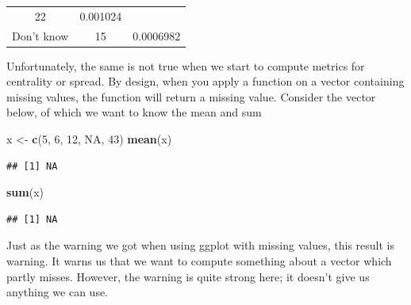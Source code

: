 \documentclass[]{tufte-book}
\newenvironment{Shaded}{}{}
\newcommand{\KeywordTok}[1]{\textcolor[rgb]{0.00,0.44,0.13}{\textbf{#1}}}
\newcommand{\DecValTok}[1]{\textcolor[rgb]{0.25,0.63,0.44}{#1}}
\newcommand{\StringTok}[1]{\textcolor[rgb]{0.25,0.44,0.63}{#1}}
\newcommand{\OtherTok}[1]{\textcolor[rgb]{0.00,0.44,0.13}{#1}}
\newcommand{\NormalTok}[1]{#1}
\begin{document}
\begin{longtable}[]{@{}ccc@{}}
\begin{minipage}[t]{0.15\columnwidth}
22\strut
\end{minipage} & \begin{minipage}[t]{0.25\columnwidth}\centering\strut
0.001024\strut
\end{minipage}\tabularnewline
\begin{minipage}[t]{0.33\columnwidth}\centering\strut
Don't know\strut
\end{minipage} & \begin{minipage}[t]{0.15\columnwidth}\centering\strut
15\strut
\end{minipage} & \begin{minipage}[t]{0.25\columnwidth}\centering\strut
0.0006982\strut
\end{minipage}\tabularnewline
\bottomrule
\end{longtable}

Unfortunately, the same is not true when we start to compute metrics for
centrality or spread. By design, when you apply a function on a vector
containing missing values, the function will return a missing value.
Consider the vector below, of which we want to know the mean and sum

\begin{Shaded}
\begin{Highlighting}[]
\NormalTok{x <-}\StringTok{ }\KeywordTok{c}\NormalTok{(}\DecValTok{5}\NormalTok{, }\DecValTok{6}\NormalTok{, }\DecValTok{12}\NormalTok{, }\OtherTok{NA}\NormalTok{, }\DecValTok{43}\NormalTok{)}
\KeywordTok{mean}\NormalTok{(x)}
\end{Highlighting}
\end{Shaded}

\begin{verbatim}
## [1] NA
\end{verbatim}

\begin{Shaded}
\begin{Highlighting}[]
\KeywordTok{sum}\NormalTok{(x)}
\end{Highlighting}
\end{Shaded}

\begin{verbatim}
## [1] NA
\end{verbatim}

Just as the warning we got when using ggplot with missing values, this
result is warning. It warns us that we want to compute something about a
vector which partly misses. However, the warning is quite strong here;
it doesn't give us anything we can use.
\end{document}
